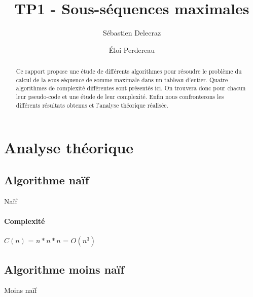 \documentclass[11pt, a4paper]{article}
\title{TP1 - Sous-séquences maximales}
\author{Sébastien Delecraz \and \'Eloi Perdereau}
\begin{document}
\maketitle

\begin{abstract}
  Ce rapport propose une étude de différents algorithmes pour résoudre le
  problème du calcul de la sous-séquence de somme maximale dans un tableau
  d'entier. Quatre algorithmes de complexité différentes sont présentés ici.
  On trouvera donc pour chacun leur pseudo-code et une étude de leur
  complexité. Enfin nous confronterons les
  différents résultats obtenus et l'analyse théorique réalisée.
\end{abstract}

\section{Analyse théorique}

\subsection{Algorithme naïf}

\begin{algorithm}[H]
  \caption{Naïf}
\end{algorithm}
\paragraph{Complexité}
$C(n)$ = $n*n*n$ = $O(n^3)$

\subsection{Algorithme moins naïf}

\begin{algorithm}[H]
  \caption{Moins naïf}
\end{algorithm}
\end{document}
